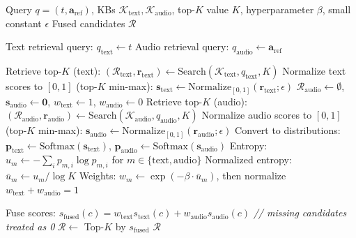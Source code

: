 \documentclass{article}
\begin{document}
	\begin{algorithm}[h]
		\caption{Uncertainty-Aware Modal Fusion}
		\label{alg:dual_retrieval}
		\begin{algorithmic}
			\REQUIRE Query $q = (t, \mathbf{a}_{\text{ref}})$, KBs $\mathcal{K}_{\text{text}}, \mathcal{K}_{\text{audio}}$, top-$K$ value $K$, hyperparameter $\beta$, small constant $\epsilon$
			\ENSURE Fused candidates $\mathcal{R}$

			\STATE Text retrieval query: $q_{\text{text}} \leftarrow t$
			\STATE Audio retrieval query: $q_{\text{audio}} \leftarrow \mathbf{a}_{\text{ref}}$

			\STATE Retrieve top-$K$ (text): $(\mathcal{R}_{\text{text}}, \mathbf{r}_{\text{text}}) \leftarrow \text{Search}(\mathcal{K}_{\text{text}}, q_{\text{text}}, K)$
			\STATE Normalize text scores to $[0,1]$ (top-$K$ min-max): $\mathbf{s}_{\text{text}} \leftarrow \text{Normalize}_{[0,1]}(\mathbf{r}_{\text{text}}; \epsilon)$
				\STATE $\mathcal{R}_{\text{audio}} \leftarrow \emptyset$, $\mathbf{s}_{\text{audio}} \leftarrow \mathbf{0}$, $w_{\text{text}} \leftarrow 1$, $w_{\text{audio}} \leftarrow 0$
			\ELSE
				\STATE Retrieve top-$K$ (audio): $(\mathcal{R}_{\text{audio}}, \mathbf{r}_{\text{audio}}) \leftarrow \text{Search}(\mathcal{K}_{\text{audio}}, q_{\text{audio}}, K)$
				\STATE Normalize audio scores to $[0,1]$ (top-$K$ min-max): $\mathbf{s}_{\text{audio}} \leftarrow \text{Normalize}_{[0,1]}(\mathbf{r}_{\text{audio}}; \epsilon)$
				\STATE Convert to distributions: $\mathbf{p}_{\text{text}} \leftarrow \text{Softmax}(\mathbf{s}_{\text{text}})$, $\mathbf{p}_{\text{audio}} \leftarrow \text{Softmax}(\mathbf{s}_{\text{audio}})$
				\STATE Entropy: $u_m \leftarrow -\sum_i p_{m,i}\log p_{m,i}$ for $m \in \{\text{text}, \text{audio}\}$
				\STATE Normalized entropy: $\bar{u}_m \leftarrow u_m/\log K$
				\STATE Weights: $w_m \leftarrow \exp(-\beta \cdot \bar{u}_m)$, then normalize $w_{\text{text}} + w_{\text{audio}} = 1$
			\ENDIF

			\STATE Fuse scores: $s_{\text{fused}}(c) = w_{\text{text}} s_{\text{text}}(c) + w_{\text{audio}} s_{\text{audio}}(c)$ \hfill \textit{// missing candidates treated as 0}
			\STATE $\mathcal{R} \leftarrow$ Top-$K$ by $s_{\text{fused}}$
			\RETURN $\mathcal{R}$
		\end{algorithmic}
	\end{algorithm}
\end{document}
